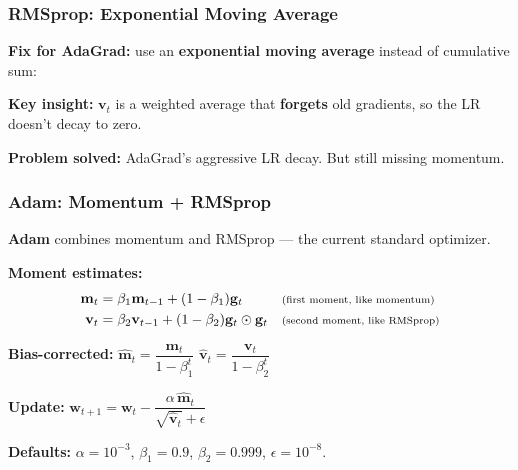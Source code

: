 \documentclass[notes,11pt, aspectratio=169]{beamer}
\newcommand{\vw}{\mathbf{w}}
\newcommand{\vg}{\mathbf{g}}
\newcommand{\vm}{\mathbf{m}}
\newcommand{\vv}{\mathbf{v}}
\begin{document}
\begin{frame}
\frametitle{RMSprop: Exponential Moving Average}

\textbf{Fix for AdaGrad:} use an \textbf{exponential moving average} instead of cumulative sum:


\vspace{6pt}
\textbf{Key insight:} $\vv_t$ is a weighted average that \textbf{forgets} old gradients, so the LR doesn't decay to zero.

\vspace{6pt}
\textbf{Problem solved:} AdaGrad's aggressive LR decay. But still missing momentum.
\end{frame}

\begin{frame}
\frametitle{Adam: Momentum + RMSprop}

\textbf{Adam} combines momentum and RMSprop --- the current standard optimizer.

\vspace{4pt}
\textbf{Moment estimates:}
\begin{align*}
    \vm_t &= \beta_1 \vm_{t-1} + (1-\beta_1)\vg_t && \text{\scriptsize(first moment, like momentum)} \\
    \vv_t &= \beta_2 \vv_{t-1} + (1-\beta_2)\vg_t \odot \vg_t && \text{\scriptsize(second moment, like RMSprop)}
\end{align*}

\textbf{Bias-corrected:} \quad $\hat{\vm}_t = \dfrac{\vm_t}{1 - \beta_1^t}$ \qquad $\hat{\vv}_t = \dfrac{\vv_t}{1 - \beta_2^t}$

\vspace{4pt}
\textbf{Update:} \quad $\vw_{t+1} = \vw_t - \dfrac{\alpha \, \hat{\vm}_t}{\sqrt{\hat{\vv}_t} + \epsilon}$

\vspace{6pt}
\textbf{Defaults:} $\alpha = 10^{-3}$, $\beta_1 = 0.9$, $\beta_2 = 0.999$, $\epsilon = 10^{-8}$.
\end{frame}
\end{document}
